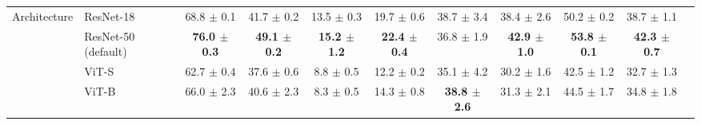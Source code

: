 \begin{table}[t]
\begin{adjustbox}{max width=\textwidth}
\begin{tabular}{l l c c c c c c c c c}
\midrule
Architecture & ResNet-18 & 68.8 {\scriptsize$\pm$ 0.1} & 41.7 {\scriptsize$\pm$ 0.2} & 13.5 {\scriptsize$\pm$ 0.3} & 19.7 {\scriptsize$\pm$ 0.6} & 38.7 {\scriptsize$\pm$ 3.4} & 38.4 {\scriptsize$\pm$ 2.6} & 50.2 {\scriptsize$\pm$ 0.2} & 38.7 {\scriptsize$\pm$ 1.1} \\
 & \rowcolor{blue!10} ResNet-50 (default) & \textbf{76.0 {\scriptsize$\pm$ 0.3}} & \textbf{49.1 {\scriptsize$\pm$ 0.2}} & \textbf{15.2 {\scriptsize$\pm$ 1.2}} & \textbf{22.4 {\scriptsize$\pm$ 0.4}} & 36.8 {\scriptsize$\pm$ 1.9} & \textbf{42.9 {\scriptsize$\pm$ 1.0}} & \textbf{53.8 {\scriptsize$\pm$ 0.1}} & \textbf{42.3 {\scriptsize$\pm$ 0.7}} \\
 & ViT-S & 62.7 {\scriptsize$\pm$ 0.4} & 37.6 {\scriptsize$\pm$ 0.6} & 8.8 {\scriptsize$\pm$ 0.5} & 12.2 {\scriptsize$\pm$ 0.2} & 35.1 {\scriptsize$\pm$ 4.2} & 30.2 {\scriptsize$\pm$ 1.6} & 42.5 {\scriptsize$\pm$ 1.2} & 32.7 {\scriptsize$\pm$ 1.3} \\
 & ViT-B & 66.0 {\scriptsize$\pm$ 2.3} & 40.6 {\scriptsize$\pm$ 2.3} & 8.3 {\scriptsize$\pm$ 0.5} & 14.3 {\scriptsize$\pm$ 0.8} & \textbf{38.8 {\scriptsize$\pm$ 2.6}} & 31.3 {\scriptsize$\pm$ 2.1} & 44.5 {\scriptsize$\pm$ 1.7} & 34.8 {\scriptsize$\pm$ 1.8} \\
\bottomrule
\end{tabular}
\end{adjustbox}
\end{table}

